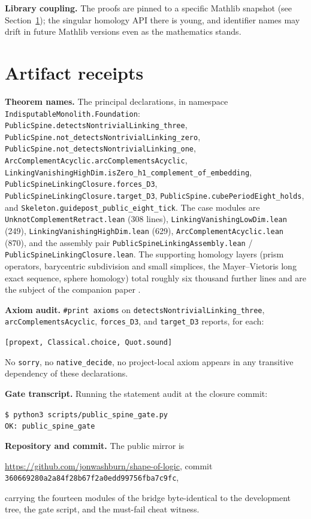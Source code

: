 \documentclass[11pt]{article}
\theoremstyle{definition}
\newcommand{\lean}[1]{\texttt{#1}}
\begin{document}
\textbf{Library coupling.} The proofs are pinned to a specific Mathlib snapshot (see Section~\ref{sec:artifact}); the singular homology API there is young, and identifier names may drift in future Mathlib versions even as the mathematics stands.

\section{Artifact receipts}
\label{sec:artifact}

\textbf{Theorem names.} The principal declarations, in namespace \lean{IndisputableMonolith.Foundation}:
\lean{PublicSpine.detectsNontrivialLinking\_three},
\lean{PublicSpine.not\_detectsNontrivialLinking\_zero},
\lean{PublicSpine.not\_detectsNontrivialLinking\_one},
\lean{ArcComplementAcyclic.arcComplementsAcyclic},
\lean{LinkingVanishingHighDim.isZero\_h1\_complement\_of\_embedding},
\lean{PublicSpineLinkingClosure.forces\_D3},
\lean{PublicSpineLinkingClosure.target\_D3},
\lean{PublicSpine.cubePeriodEight\_holds}, and
\lean{Skeleton.guidepost\_public\_eight\_tick}.
The case modules are \lean{UnknotComplementRetract.lean} (308 lines), \lean{LinkingVanishingLowDim.lean} (249), \lean{LinkingVanishingHighDim.lean} (629), \lean{ArcComplementAcyclic.lean} (870), and the assembly pair \lean{PublicSpineLinkingAssembly.lean} / \lean{PublicSpineLinkingClosure.lean}. The supporting homology layers (prism operators, barycentric subdivision and small simplices, the Mayer--Vietoris long exact sequence, sphere homology) total roughly six thousand further lines and are the subject of the companion paper \cite{companion}.

\textbf{Axiom audit.} \lean{\#print axioms} on \lean{detectsNontrivialLinking\_three}, \lean{arcComplementsAcyclic}, \lean{forces\_D3}, and \lean{target\_D3} reports, for each:
\begin{center}
\lean{[propext, Classical.choice, Quot.sound]}
\end{center}
No \lean{sorry}, no \lean{native\_decide}, no project-local axiom appears in any transitive dependency of these declarations.

\textbf{Gate transcript.} Running the statement audit at the closure commit:
\begin{center}
\lean{\$ python3 scripts/public\_spine\_gate.py} \\
\lean{OK: public\_spine\_gate}
\end{center}

\textbf{Repository and commit.} The public mirror is
\begin{center}
\url{https://github.com/jonwashburn/shape-of-logic}, \quad commit \lean{360669280a2a84f28b67f2a0edd99756fba7c9fc},
\end{center}
carrying the fourteen modules of the bridge byte-identical to the development tree, the gate script, and the must-fail cheat witness.
\end{document}
